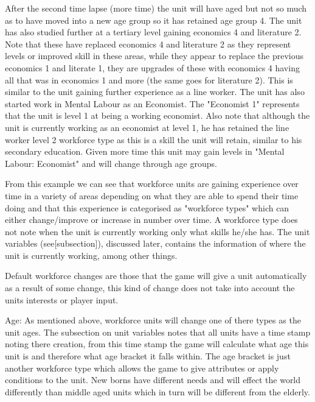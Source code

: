 After the second time lapse (more time) the unit will have aged but not so much as to have moved into a new age group so it has retained age group 4. The unit has also studied further at a tertiary level gaining economics 4 and literature 2. Note that these have replaced economics 4 and literature 2 as they represent levels or improved skill in these areas, while they appear to replace the previous economics 1 and literate 1, they are upgrades of these with economics 4 having all that was in economics 1 and more (the same goes for literature 2). This is similar to the unit gaining further experience as a line worker. The unit has also started work in Mental Labour as an Economist. The "Economist 1" represents that the unit is level 1 at being a working economist. Also note that although the unit is currently working as an economist at level 1, he has retained the line worker level 2 workforce type as this is a skill the unit will retain, similar to his secondary education. Given more time this unit may gain levels in "Mental Labour: Economist" and will change through age groups. 

From this example we can see that workforce units are gaining experience over time in a variety of areas depending on what they are able to spend their time doing and that this experience is categorised as "workforce types" which can either change/improve or increase in number over time. A workforce type does not note when the unit is currently working only what skills he/she has. The unit variables (see[subsection]), discussed later, contains the information of where the unit is currently working, among other things.





Default workforce changes are those that the game will give a unit automatically as a result of some change, this kind of change does not take into account the units interests or player input.

Age:
As mentioned above, workforce units will change one of there types as the unit ages. The subsection on unit variables notes that all units have a time stamp noting there creation, from this time stamp the game will calculate what age this unit is and therefore what age bracket it falls within. The age bracket is just another workforce type which allows the game to give attributes or apply conditions to the unit. New borns have different needs and will effect the world differently than middle aged units which in turn will be different from the elderly. 

